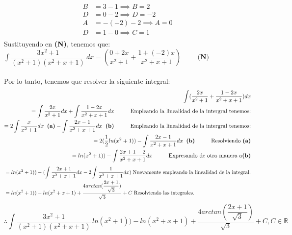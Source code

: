 \documentclass[letterpaper]{article}
\newcommand{\R}{\mathds{R}}
\renewcommand{\*}{\cdot}
\theoremstyle{definition}
\begin{document}
\begin{enumerate}
\begin{enumerate}
\begin{align*}
B &= 3-1 \implies B = 2\\
D &= 0-2 \implies D = -2\\
A &= -(-2)-2 \implies A=0\\
D &= 1-0 \implies C=1\\
\end{align*}
Sustituyendo en \textbf{(N)}, tenemos que: 
$\int  \dfrac{3x^2 + 1}{(x^2 +1 ) (x^2 + x +1)} \, dx= (\dfrac{0+2x}{x^2+1}+\dfrac{1+(-2)x}{x^2+x+1})\hspace{1cm}{\textbf{(N)}}$\\
\\
Por lo tanto, tenemos que resolver la siguiente integral:
\begin{align*}
\int(\dfrac{2x}{x^2+1}+\dfrac{1-2x}{x^2+x+1}) dx\\
=\int \dfrac{2x}{x^2+1}dx +\int \dfrac{1-2x}{x^2+x+1}dx \hspace{1cm}\text{Empleando la linealidad de la intergral tenemos:}\\
=2\int \dfrac{x}{x^2+1}dx\hspace{.2cm}{\textbf{(a)}}-\int \dfrac{2x-1}{x^2+x+1}dx\hspace{.2cm}{\textbf{(b)}} \hspace{1cm}\text{Empleando la linealidad de la intergral tenemos:}\\
=2(\dfrac{1}{2}ln(x^2+1))-\int \dfrac{2x-1}{x^2+x+1}dx\hspace{.2cm}{\textbf{(b)}} \hspace{1cm}\text{Resolviendo }\textbf{(a)}\\
=ln(x^2+1))-\int \dfrac{2x+1-2}{x^2+x+1}dx \hspace{1cm}\text{Expresando de otra manera a}\textbf{(b)}\\
\end{align*}
\begin{align*}
&=ln(x^2+1))-(\int \dfrac{2x+1}{x^2+x+1}dx - 2\int \dfrac{1}{x^2+x+1}dx) \hspace{.1cm}\text{Nuevamente empleando la linealidad de la integral.}\\
&=ln(x^2+1))-ln(x^2+x+1) + \dfrac{4arctan(\dfrac{2x+1}{\sqrt{3}})}{\sqrt{3}}+C \hspace{.1cm}\text{Resolviendo las integrales.}
\end{align*}
\[ \therefore \int  \dfrac{3x^2 + 1}{(x^2 +1 ) (x^2 + x +1)} \, ln(x^2+1))-ln(x^2+x+1) + \dfrac{4arctan(\dfrac{2x+1}{\sqrt{3}})}{\sqrt{3}}+C, C\in \R \] 
\end{enumerate}

 \end{enumerate}
\end{document}
